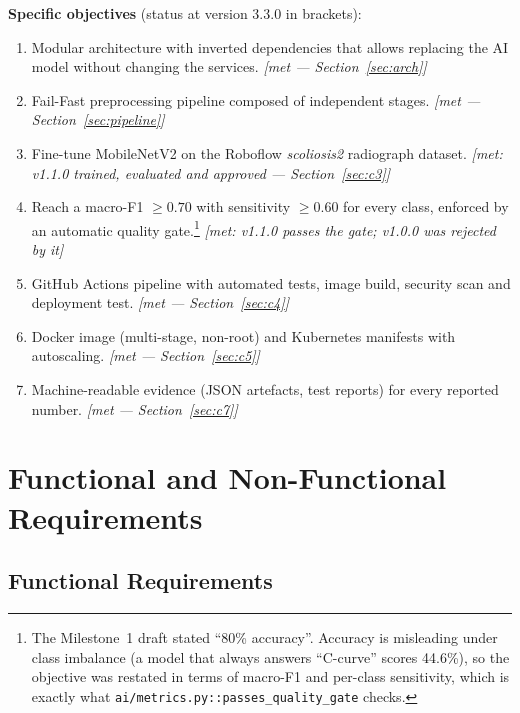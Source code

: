 \documentclass[12pt,a4paper]{article}
\newcommand{\fp}[1]{\nolinkurl{#1}}
\begin{document}
\textbf{Specific objectives} (status at version 3.3.0 in brackets):
\begin{enumerate}[leftmargin=*, label=O\arabic*.]
    \item Modular architecture with inverted dependencies that allows replacing the AI model without
          changing the services. \textit{[met --- Section~\ref{sec:arch}]}
    \item Fail-Fast preprocessing pipeline composed of independent stages. \textit{[met --- Section~\ref{sec:pipeline}]}
    \item Fine-tune MobileNetV2 on the Roboflow \emph{scoliosis2} radiograph dataset. \textit{[met: v1.1.0 trained, evaluated and approved --- Section~\ref{sec:c3}]}
    \item Reach a macro-F1 $\geq 0.70$ with sensitivity $\geq 0.60$ for every class, enforced by an
          automatic quality gate.\footnote{The Milestone~1 draft stated ``80\% accuracy''. Accuracy is
          misleading under class imbalance (a model that always answers ``C-curve'' scores 44.6\%), so
          the objective was restated in terms of macro-F1 and per-class sensitivity, which is exactly what
          \fp{ai/metrics.py::passes_quality_gate} checks.} \textit{[met: v1.1.0 passes the gate; v1.0.0 was rejected by it]}
    \item GitHub Actions pipeline with automated tests, image build, security scan and deployment test. \textit{[met --- Section~\ref{sec:c4}]}
    \item Docker image (multi-stage, non-root) and Kubernetes manifests with autoscaling. \textit{[met --- Section~\ref{sec:c5}]}
    \item Machine-readable evidence (JSON artefacts, test reports) for every reported number. \textit{[met --- Section~\ref{sec:c7}]}
\end{enumerate}

\section{Functional and Non-Functional Requirements}

\subsection{Functional Requirements}
\end{document}
